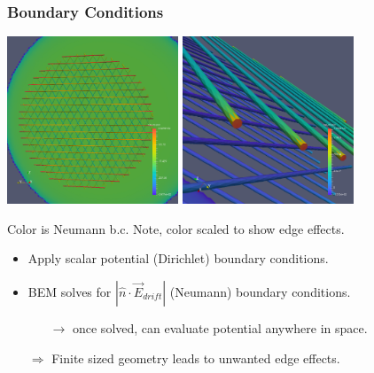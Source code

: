 \documentclass[xcolor=dvipsnames]{beamer}
\begin{document}
\begin{frame}
  \frametitle{Boundary Conditions}
  \begin{center}
    \includegraphics[height=5cm,clip,trim=0cm 0cm 0cm 0cm]{steps/drift-boundary1.png}%
    \includegraphics[height=5cm,clip,trim=0cm 0cm 00cm 0cm]{steps/drift-boundary2.png}

    \scriptsize Color is Neumann b.c.
    Note, color scaled to show edge effects.
  \end{center}
  \begin{itemize}\footnotesize
  \item Apply scalar potential (Dirichlet) boundary conditions.
  \item BEM solves for $|\hat{n}\cdot\vec{E}_{drift}|$ (Neumann) boundary conditions.
    \begin{itemize}\scriptsize
    \item [$\rightarrow$] once solved, can evaluate potential anywhere in space.
    \end{itemize}
  \item[$\Rightarrow$] Finite sized geometry leads to unwanted edge effects.
  \end{itemize}
  
\end{frame}
\end{document}
